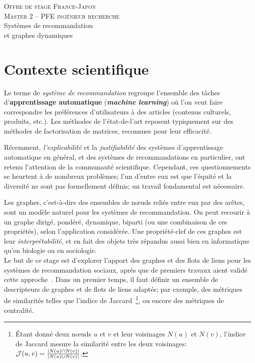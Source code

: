 \documentclass[a4paper, 12pt]{article}
\newcommand{\dest}{ 
    \textsc{\Large Offre de stage France-Japon\\ 
    Master 2 -- PFE ingénieur recherche}\\[1ex]
    {\Huge Systèmes de recommandation \\
    et graphes dynamiques}
  }
\begin{document}
\pagestyle{fancy} 

\addvspace{1cm}
\begin{center}
  \dest
\end{center}

\addvspace{1cm}

\section*{Contexte scientifique}

Le terme de {\em système de recommandation} regroupe l'ensemble des tâches d'{\bf apprentissage automatique} ({\bf {\em machine learning}}) où l'on veut faire correspondre les préférences d'utilisateurs à des articles (contenus culturels, produits, etc.). Les méthodes de l'état-de-l'art reposent typiquement sur des méthodes de factorisation de matrices, reconnues pour leur efficacité.

Récemment, {\em l'explicabilité} et la {\em justifiabilité} des systèmes d'apprentissage automatique en général, et des systèmes de recommandations en particulier, ont retenu l'attention de la communauté scientifique.
Cependant, ces questionnements se heurtent à de nombreux problèmes; l'un d'entre eux est que l'équité et la diversité ne sont pas formellement définis; un travail fondamental est nécessaire.

Les graphes, c'est-à-dire des ensembles de n\oe{}uds reliés entre eux par des arêtes, sont un modèle naturel pour les systèmes de recommandation.
On peut recourir à un graphe dirigé, pondéré, dynamique, biparti (ou une combinaison de ces propriétés), selon l'application considérée.
Une propriété-clef de ces graphes est leur {\em interprétabilité}, et en fait des objets très répandus aussi bien en informatique qu'en biologie ou en sociologie.\\

Le but de ce stage est d'explorer l'apport des graphes et des flots de liens pour les systèmes de recommandation sociaux, après que de premiers travaux aient validé cette approche~\cite{VIARD2019127}.
Dans un premier temps, il faut définir un ensemble de descripteurs de graphes et de flots de liens adaptés; par exemple, des métriques de similarités telles que l'indice de Jaccard~\footnote{Étant donné deux n\oe{}uds $u$ et $v$ et leur voisinages $N(u)$ et $N(v)$, l'indice de Jaccard mesure la similarité entre les deux voisinages: ${\cal J}(u,v) = \frac{|N(u)\cap N(v)|}{|N(u) \cup N(v)|}$.}, ou encore des métriques de centralité.
\end{document}
